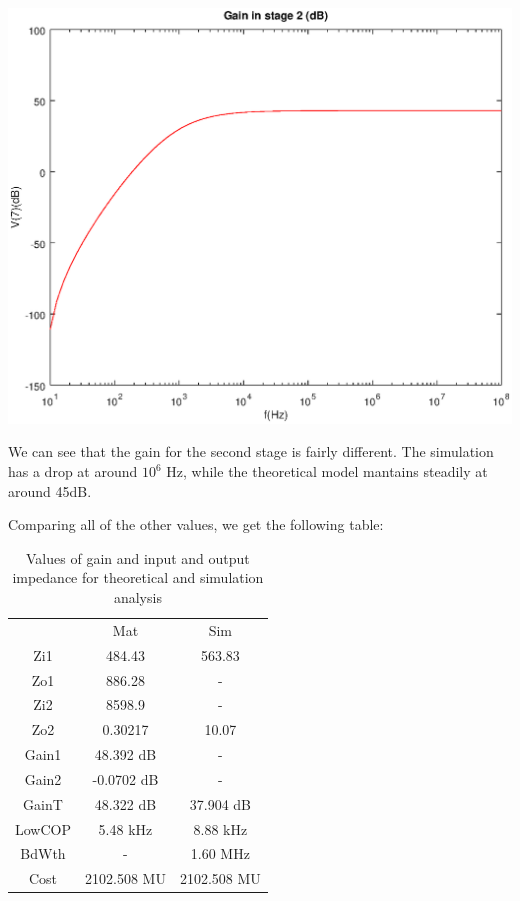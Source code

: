 \hspace{1mm}
\begin{minipage}[c]{0.50\linewidth}
\includegraphics[width=1\linewidth]{vo2.eps}
\end{minipage}

We can see that the gain for the second stage is fairly different. The simulation has a drop at around $10^6$ Hz, while the theoretical model mantains steadily at around 45dB.

Comparing all of the other values, we get the following table: 


\begin{table}[H]
\addtolength{\tabcolsep}{-4pt}
\caption{Values of gain and input and output impedance for theoretical and simulation analysis}
\vspace{-3mm}
\begin{tabular}{|c|c|c|}
\hline
 &	Mat &	Sim\\

Zi1 &484.43 &	563.83 \\

Zo1&886.28 	&-\\

Zi2&	8598.9 	&-\\

Zo2&	0.30217 &	10.07 \\

Gain1&	48.392 dB	&-\\

Gain2&	-0.0702 dB&-\\	

GainT&	48.322 dB	&37.904 dB\\

LowCOP&	5.48 kHz&	8.88 kHz\\

BdWth	&-	&1.60 MHz\\

Cost	&2102.508 MU&	2102.508 MU\\
\hline
\end{tabular}
\label{tab:Comparison}
\end{table}

